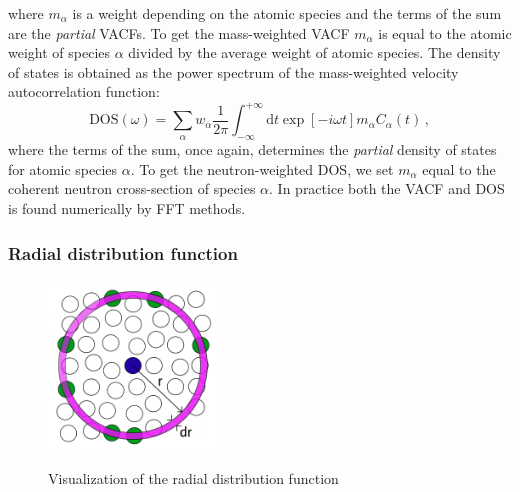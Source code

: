 \noindent where $m_\alpha$ is a weight depending on the atomic species and the terms of the sum are the \emph{partial} VACFs. To get the mass-weighted VACF $m_\alpha$ is equal to the atomic weight of species $\alpha$ divided by the average weight of atomic species. The density of states is obtained as the power spectrum of the mass-weighted velocity autocorrelation function:
%
\[ \text{DOS}(\omega) = \sum_\alpha w_\alpha \frac{1}{2\pi} \int^{+\infty}_{-\infty} \mathrm{d}t \exp[-i\omega t] m_\alpha C_\alpha(t) \, , \]
%
where the terms of the sum, once again, determines the \emph{partial} density of states for atomic species $\alpha$. To get the neutron-weighted DOS, we set $m_\alpha$ equal to the coherent neutron cross-section of species $\alpha$. In practice both the VACF and DOS is found numerically by FFT methods.

\subsubsection{Radial distribution function}

\begin{figure}
	\centering
	\includegraphics[width=0.4\textwidth]{fig/temp/gr.png}
	\label{fig:rdf}
	\caption[RDF visualization]{Visualization of the radial distribution function}
\end{figure}

